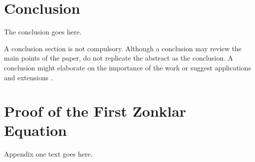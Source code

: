 \documentclass[journal]{IAENGtran}
\begin{document}



\section{Conclusion}
The conclusion goes here.

A conclusion section is not compulsory. Although a conclusion may
review the main points of the paper, do not replicate the abstract
as the conclusion. A conclusion might elaborate on the importance of
the work or suggest applications and extensions \cite{IJCS, EL,
IJAM, WCECS, WCE, IMECS}.





%


\appendices
\section{Proof of the First Zonklar Equation}
Appendix one text goes here.
\end{document}
